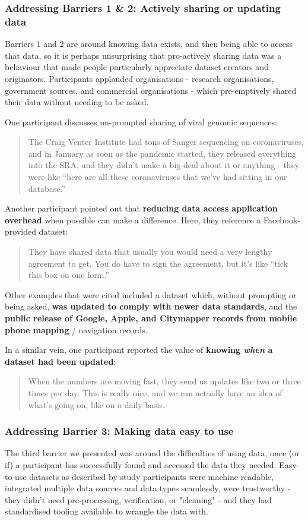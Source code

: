 \documentclass{CUP-JNL-DAP}%
\begin{document}
\subsubsection{Addressing Barriers 1 \& 2: Actively sharing or updating data} 
Barriers 1 and 2 are around knowing data exists, and then being able to access that data, so it is perhaps unsurprising that pro-actively sharing data was a behaviour that made people particularly appreciate dataset creators and originators. Participants applauded organisations - research organisations, government sources, and commercial organisations - which pre-emptively shared their data without needing to be asked.

One participant discusses un-prompted sharing of viral genomic sequences: 

\blockquote{The Craig Venter Institute had tons of Sanger sequencing on coronaviruses, and in January as soon as the pandemic started, they released everything into the SRA, and they didn't make a big deal about it or anything - they were like \enquote{here are all these coronaviruses that we've had sitting in our database.}}

Another participant pointed out that \textbf{reducing data access application overhead} when possible can make a difference. Here, they reference a Facebook-provided dataset: 

\blockquote{They have shared data that usually you would need a very lengthy agreement to get. You do have to sign the agreement, but it's like \enquote{tick this box on one form.}}

Other examples that were cited included a dataset which, without prompting or being asked, \textbf{was updated to comply with newer data standards}, and the \textbf{public release of Google, Apple, and Citymapper records from mobile phone mapping} / navigation records. 

In a similar vein, one participant reported the value of \textbf{knowing \textit{when} a dataset had been updated}:

\blockquote{When the numbers are moving fast, they send us updates like two or three times per day. This is really nice, and we can actually have an idea of what's going on, like on a daily basis.}

\subsubsection{Addressing Barrier 3: Making data easy to use} 
The third barrier we presented was around the difficulties of using data, once (or if) a participant has successfully found and accessed the data they needed. Easy-to-use datasets as described by study participants were machine readable, integrated multiple data sources and data types seamlessly, were trustworthy - they didn't need pre-processing, verification, or "cleaning" - and they had standardised tooling available to wrangle the data with.
\end{document}
